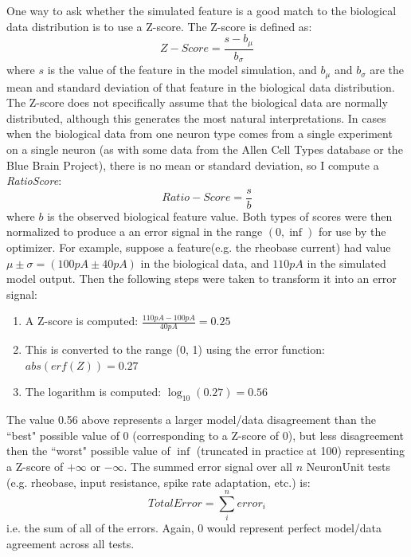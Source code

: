 One way to ask whether the simulated feature is a good match to the biological data distribution is to use a Z-score.
The Z-score is defined as:
\begin{equation}
Z-Score = \frac{s - b_{\mu}}{b_{\sigma}}
\end{equation}
where $s$ is the value of the feature in the model simulation, and $b_{\mu}$ and $b_{\sigma}$ are the mean and standard deviation of that feature in the biological data distribution.
The Z-score does not specifically assume that the biological data are normally distributed, although this generates the most natural interpretations.
In cases when the biological data from one neuron type comes from a single experiment on a single neuron (as with some data from the Allen Cell Types database or the Blue Brain Project), there is no mean or standard deviation, so I compute a \emph{RatioScore}:
\begin{equation}
Ratio-Score = \frac{s}{b}
\end{equation}
where $b$ is the observed biological feature value.
Both types of scores were then normalized to produce a an error signal in the range $(0, \inf)$ for use by the optimizer.
For example, suppose a feature(e.g. the rheobase current) had value $\mu \pm \sigma = (100pA \pm 40pA)$ in the biological data, and $110 pA$ in the simulated model output.
Then the following steps were taken to transform it into an error signal:
\begin{enumerate}
 \item A Z-score is computed: $\frac{110 pA - 100 pA}{40 pA} = 0.25$
 \item This is converted to the range (0, 1) using the error function: $abs(erf(Z)) = 0.27$ 
 \item The logarithm is computed: $\log_{10}(0.27) = 0.56$ 
\end{enumerate}
The value 0.56 above represents a larger model/data disagreement than the ``best" possible value of 0 (corresponding to a Z-score of 0), but less disagreement then the ``worst" possible value of $\inf$ (truncated in practice at 100) representing a Z-score of $+\infty$ or $-\infty$. The summed error signal over all $n$ NeuronUnit tests (e.g. rheobase, input resistance, spike rate adaptation, etc.) is:
\begin{equation}
Total  Error = \sum_i^n error_i
\end{equation}
i.e. the sum of all of the errors.  Again, 0 would represent perfect model/data agreement across all tests.

